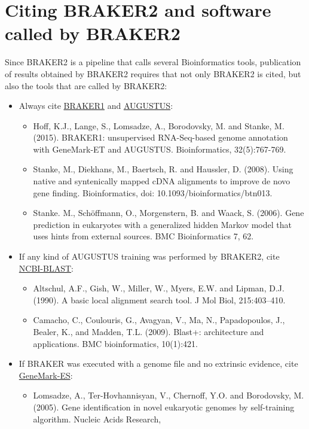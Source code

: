 \documentclass[a4paper,10pt]{report}
\begin{document}
\chapter{Citing BRAKER2 and software called by BRAKER2}

Since BRAKER2 is a pipeline that calls several Bioinformatics tools, publication of results obtained by BRAKER2 requires that not only BRAKER2 is cited, but also the tools that are called by BRAKER2:

\begin{itemize}
	\item Always cite \underline{BRAKER1} and \underline{AUGUSTUS}: 
	\begin{itemize}
		\item Hoff, K.J., Lange, S., Lomsadze, A., Borodovsky, M. and Stanke, M. (2015). BRAKER1: unsupervised RNA-Seq-based genome annotation with GeneMark-ET and AUGUSTUS. Bioinformatics, 32(5):767-769.
		\item Stanke, M., Diekhans, M., Baertsch, R. and Haussler, D. (2008). Using native and syntenically mapped cDNA alignments to improve de novo gene finding. Bioinformatics, doi: 10.1093/bioinformatics/btn013.
		\item Stanke. M., Sch\"{o}ffmann, O., Morgenstern, B. and Waack, S. (2006). Gene prediction in eukaryotes with a generalized hidden Markov model that uses hints from external sources. BMC Bioinformatics 7, 62. 
	\end{itemize}
    \item If any kind of AUGUSTUS training was performed by BRAKER2, cite \underline{NCBI-BLAST}:
    \begin{itemize}
    	\item Altschul, A.F., Gish, W., Miller, W., Myers, E.W. and Lipman, D.J. (1990). A basic local alignment
    	search tool. J Mol Biol, 215:403–410.
    	\item Camacho, C., Coulouris, G., Avagyan, V., Ma, N., Papadopoulos, J.,
    	Bealer, K., and Madden, T.L. (2009). Blast+: architecture and applications. BMC bioinformatics,
    	10(1):421.
    \end{itemize}
	\item If BRAKER was executed with a genome file and no extrinsic evidence, cite \underline{GeneMark-ES}:
	\begin{itemize}
		\item Lomsadze, A., Ter-Hovhannisyan, V., Chernoff, Y.O. and Borodovsky, M. (2005). Gene identification
		in novel eukaryotic genomes by self-training algorithm. Nucleic Acids Research,

\end{itemize}
\end{itemize}
\end{document}
